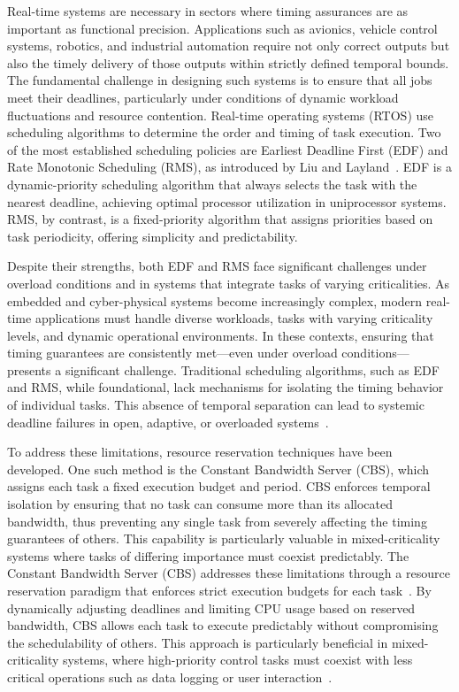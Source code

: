 \documentclass[conference]{IEEEtran}
\begin{document}
Real-time systems are necessary in sectors where timing assurances are as important as functional precision. Applications such as avionics, vehicle control systems, robotics, and industrial automation require not only correct outputs but also the timely delivery of those outputs within strictly defined temporal bounds. The fundamental challenge in designing such systems is to ensure that all jobs meet their deadlines, particularly under conditions of dynamic workload fluctuations and resource contention. Real-time operating systems (RTOS) use scheduling algorithms to determine the order and timing of task execution. Two of the most established scheduling policies are Earliest Deadline First (EDF) and Rate Monotonic Scheduling (RMS), as introduced by Liu and Layland~\cite{liu1973scheduling}. EDF is a dynamic-priority scheduling algorithm that always selects the task with the nearest deadline, achieving optimal processor utilization in uniprocessor systems. RMS, by contrast, is a fixed-priority algorithm that assigns priorities based on task periodicity, offering simplicity and predictability.

Despite their strengths, both EDF and RMS face significant challenges under overload conditions and in systems that integrate tasks of varying criticalities. As embedded and cyber-physical systems become increasingly complex, modern real-time applications must handle diverse workloads, tasks with varying criticality levels, and dynamic operational environments. In these contexts, ensuring that timing guarantees are consistently met—even under overload conditions—presents a significant challenge. Traditional scheduling algorithms, such as EDF and RMS, while foundational, lack mechanisms for isolating the timing behavior of individual tasks. This absence of temporal separation can lead to systemic deadline failures in open, adaptive, or overloaded systems~\cite{liu1973scheduling}.

To address these limitations, resource reservation techniques have been developed. One such method is the Constant Bandwidth Server (CBS), which assigns each task a fixed execution budget and period. CBS enforces temporal isolation by ensuring that no task can consume more than its allocated bandwidth, thus preventing any single task from severely affecting the timing guarantees of others. This capability is particularly valuable in mixed-criticality systems where tasks of differing importance must coexist predictably. The Constant Bandwidth Server (CBS) addresses these limitations through a resource reservation paradigm that enforces strict execution budgets for each task~\cite{abeni1998integrating}. By dynamically adjusting deadlines and limiting CPU usage based on reserved bandwidth, CBS allows each task to execute predictably without compromising the schedulability of others. This approach is particularly beneficial in mixed-criticality systems, where high-priority control tasks must coexist with less critical operations such as data logging or user interaction~\cite{baruah2004dynamic}.
\end{document}

